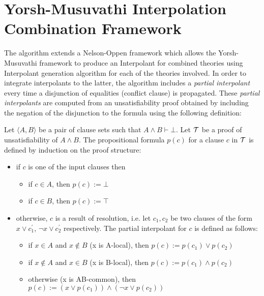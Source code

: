 \section{Yorsh-Musuvathi Interpolation Combination Framework}

The algorithm extends a Nelson-Oppen framework which allows the Yorsh-Musuvathi
framework to produce an Interpolant
for combined theories using Interpolant
generation algorithm for each of the 
theories involved. 
In order to 
integrate interpolants to the latter, 
the algorithm includes a 
\emph{partial interpolant} every time a disjunction of equalities 
(conflict clause) is propagated. These \emph{partial interpolants} are 
computed from an unsatisfiability proof obtained by including the 
negation of the disjunction to the formula using the following
definition: 

\begin{definition} \cite{10.1007/11532231_26}
  Let $\langle A, B \rangle$ be a pair of clause sets such
  that $A \land B \vdash \bot$. Let $\cal{T}$ be a proof of
  unsatisfiability of $A \land B$. The propositional 
  formula $p(c)$ for a clause $c$ in $\cal{T}$ is defined
  by induction on the proof structure:
  \begin{itemize}
    \item if $c$ is one of the input clauses then
      \begin{itemize}
        \item if $c \in A$, then $p(c) := \bot$
        \item if $c \in B$, then $p(c) := \top$
      \end{itemize}
    \item otherwise, $c$ is a result of resolution, i.e. 
      let $c_1, c_2$ be two clauses of the form $x \lor c_1^{'}$,
      $\neg x \lor c_2^{'}$ respectively. The partial interpolant 
      for $c$ is defined as follows:
      \begin{itemize}
        \item if $x \in A$ and $x \not \in B$ (x is A-local), then $p(c) := p(c_1) \lor p(c_2)$
        \item if $x \not \in A$ and $x \in B$ (x is B-local), then $p(c) := p(c_1) \land p(c_2)$
        \item otherwise (x is AB-common), then 
          $p(c) := (x \lor p(c_1)) \land (\neg x \lor p(c_2))$
      \end{itemize}
  \end{itemize}
\end{definition}

